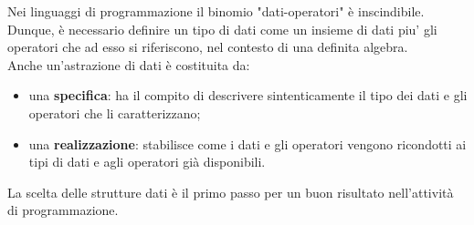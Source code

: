 \documentclass[12pt]{report}
\begin{document}
	Nei linguaggi di programmazione il binomio "dati-operatori" è inscindibile. Dunque, è necessario definire un tipo di dati come un insieme di dati piu' gli operatori che ad esso si riferiscono, nel contesto di una definita algebra. \\
	Anche un'astrazione di dati è costituita da:
	\begin{itemize}
		\item una \textbf{specifica}: ha il compito di descrivere sintenticamente il tipo dei dati e gli operatori che li caratterizzano;
		\item una \textbf{realizzazione}: stabilisce come i dati e gli operatori vengono ricondotti ai tipi di dati e agli operatori già disponibili.
	\end{itemize}
	La scelta delle strutture dati è il primo passo per un buon risultato nell'attività di programmazione.
\end{document}
